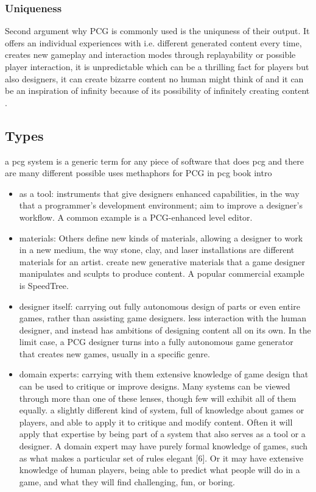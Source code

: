 \documentclass[MGS,Master,english]{twbook}%
\begin{document}
\subsubsection{Uniqueness}
Second argument why PCG is commonly used is the uniquness of their output. It offers an individual experiences with i.e. different generated content every time, creates new gameplay and interaction modes through replayability or possible player interaction, it is unpredictable which can be a thrilling fact for players but also designers, it can create bizarre content no human might think of and it can be an inspiration of infinity because of its possibility of infinitely creating content \cite{pcg::inGameDesign}.
\subsection{Types}
a pcg system is a generic term for any piece of software that does pcg and there are many different possible uses \cite{pcg::book}
methaphors for PCG in pcg book intro\\
\begin{itemize}
	\item as a tool: instruments that give designers enhanced capabilities, in the way that a programmer’s development	environment; aim to improve a designer’s workflow. A common example is a PCG-enhanced level editor.
	\item materials:  Others define new kinds of materials, allowing a designer to work in a new medium, the way stone, clay, and laser installations are different materials for an artist. create new generative materials that a game designer manipulates and sculpts to produce content. A popular commercial example is SpeedTree.
	\item designer itself: carrying out fully autonomous design of parts or even entire games, rather than assisting game designers. less interaction with the human designer, and	instead has ambitions of designing content all on its own. In the limit case, a PCG designer turns into a fully autonomous game generator that creates new games, usually in a specific genre.
	\item domain experts: carrying with them extensive knowledge of game design that can be used to critique or improve designs. Many systems can be viewed through more	than one of these lenses, though few will exhibit all of them equally. a slightly different kind of system, full of knowledge about games or players, and able to apply it to critique and modify content. Often it will apply that expertise by being part of a system that also serves as a tool or a designer. A domain expert may have purely formal knowledge of games, such as what makes a particular set of rules elegant [6]. Or it may have extensive knowledge of human players, being able to predict what people will do in a game, and what they will find challenging, fun, or boring.
\end{itemize}
\end{document}
